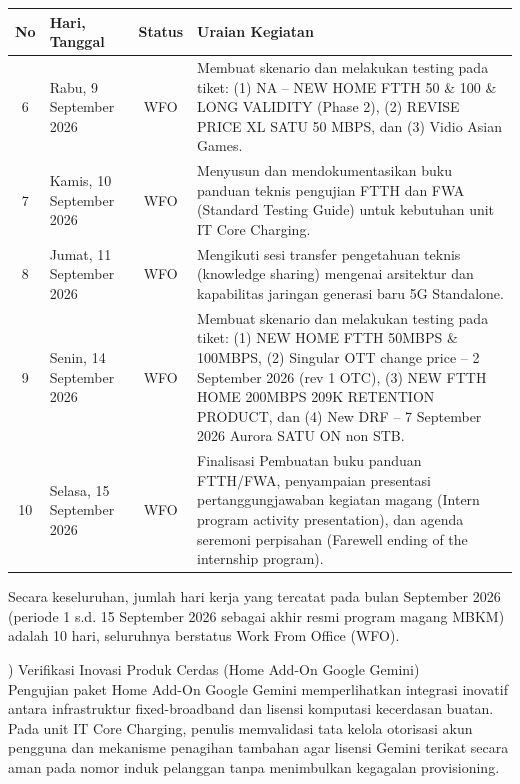\documentclass[12pt,a4paper]{article}
\begin{document}
\clearpage
\begin{singlespace}
\noindent
\begin{tabular}{|c|p{2.6cm}|c|p{9.8cm}|}
\hline
\textbf{No} & \textbf{Hari, Tanggal} & \textbf{Status} & \textbf{Uraian Kegiatan} \\
\hline
6 & Rabu, 9 September 2026 & WFO & Membuat skenario dan melakukan testing pada tiket: (1) NA -- NEW HOME FTTH 50 \& 100 \& LONG VALIDITY (Phase 2), (2) REVISE PRICE XL SATU 50 MBPS, dan (3) Vidio Asian Games. \\
\hline
7 & Kamis, 10 September 2026 & WFO & Menyusun dan mendokumentasikan buku panduan teknis pengujian FTTH dan FWA (Standard Testing Guide) untuk kebutuhan unit IT Core Charging. \\
\hline
8 & Jumat, 11 September 2026 & WFO & Mengikuti sesi transfer pengetahuan teknis (knowledge sharing) mengenai arsitektur dan kapabilitas jaringan generasi baru 5G Standalone. \\
\hline
9 & Senin, 14 September 2026 & WFO & Membuat skenario dan melakukan testing pada tiket: (1) NEW HOME FTTH 50MBPS \& 100MBPS, (2) Singular OTT change price -- 2 September 2026 (rev 1 OTC), (3) NEW FTTH HOME 200MBPS 209K RETENTION PRODUCT, dan (4) New DRF -- 7 September 2026 Aurora SATU ON non STB. \\
\hline
10 & Selasa, 15 September 2026 & WFO & Finalisasi Pembuatan buku panduan FTTH/FWA, penyampaian presentasi pertanggungjawaban kegiatan magang (Intern program activity presentation), dan agenda seremoni perpisahan (Farewell ending of the internship program). \\
\hline
\end{tabular}
\end{singlespace}

\vspace{0.2cm}
\noindent Secara keseluruhan, jumlah hari kerja yang tercatat pada bulan September 2026 (periode 1 s.d. 15 September 2026 sebagai akhir resmi program magang MBKM) adalah 10 hari, seluruhnya berstatus Work From Office (WFO).

\clearpage
{}
) Verifikasi Inovasi Produk Cerdas (Home Add-On Google Gemini)\\
Pengujian paket Home Add-On Google Gemini memperlihatkan integrasi inovatif antara infrastruktur fixed-broadband dan lisensi komputasi kecerdasan buatan. Pada unit IT Core Charging, penulis memvalidasi tata kelola otorisasi akun pengguna dan mekanisme penagihan tambahan agar lisensi Gemini terikat secara aman pada nomor induk pelanggan tanpa menimbulkan kegagalan provisioning.
\end{document}
